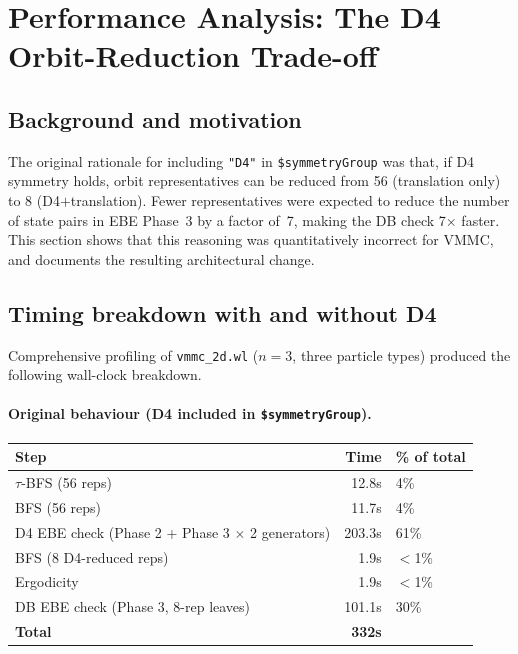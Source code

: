 \documentclass[12pt,a4paper]{article}
\theoremstyle{critical}
\theoremstyle{remark}
\theoremstyle{verified}
\begin{document}
\section{Performance Analysis: The D4 Orbit-Reduction Trade-off}
\label{sec:d4perf}

\subsection{Background and motivation}

The original rationale for including \texttt{"D4"} in \texttt{\$symmetryGroup}
was that, if D4 symmetry holds, orbit representatives can be reduced from 56
(translation only) to 8 (D4$+$translation).  Fewer representatives were expected
to reduce the number of state pairs in EBE Phase~3 by a factor of~7, making the
DB check 7$\times$ faster.  This section shows that this reasoning was
quantitatively incorrect for VMMC, and documents the resulting architectural
change.

\subsection{Timing breakdown with and without D4}

Comprehensive profiling of \texttt{vmmc\_2d.wl} ($n=3$, three particle types)
produced the following wall-clock breakdown.

\paragraph{Original behaviour (D4 included in \texttt{\$symmetryGroup}).}
\begin{center}
\begin{tabular}{lrl}
\toprule
\textbf{Step} & \textbf{Time} & \textbf{\% of total} \\
\midrule
$\tau$-BFS (56 reps) & 12.8s & 4\% \\
BFS (56 reps) & 11.7s & 4\% \\
D4 EBE check (Phase 2 + Phase 3 $\times$ 2 generators) & 203.3s & 61\% \\
BFS (8 D4-reduced reps) & 1.9s & $<$1\% \\
Ergodicity & 1.9s & $<$1\% \\
DB EBE check (Phase 3, 8-rep leaves) & 101.1s & 30\% \\
\midrule
\textbf{Total} & \textbf{332s} & \\
\bottomrule
\end{tabular}
\end{center}
\end{document}
